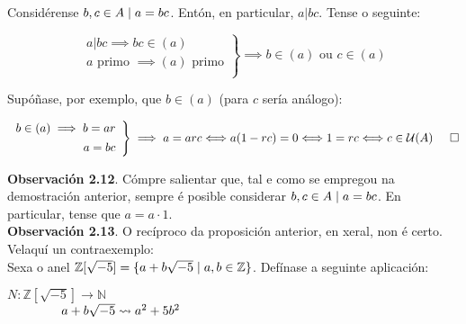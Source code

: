 \documentclass[twoside]{report}
\theoremstyle{mystyle}
\begin{document}
\noindent Considérense $b, c \in A \hspace{1mm} | \hspace{1mm} a = bc$. Entón, en particular, $a | bc$. Tense o seguinte:

\[ 
\left. \begin{array}{r} 
a | bc \implies bc \in (a) \\[1ex]
a \text{ primo } \implies (a) \text{ primo}\\
\end{array} \right\} 
\implies b \in (a) \text{ ou } c \in (a)
\]

\noindent Supóñase, por exemplo, que $b \in (a)$ (para $c$ sería análogo):

\[ 
\left. \begin{array}{r} 
b \in (a) \implies b = ar \\[1ex]
a = bc\\
\end{array} \right\} 
\implies a = arc \Longleftrightarrow a(1 - rc) = 0 \Longleftrightarrow 1 = rc \Longleftrightarrow c \in \mathcal{U}(A) \hspace{5mm} \square
\]

\vspace{3mm}

\noindent \textbf{Observación 2.12}. Cómpre salientar que, tal e como se empregou na demostración anterior, sempre é posible considerar $b,c \in A \hspace{1mm} | \hspace{1mm} a = bc$. En particular, tense que $a = a \cdot 1$.\\

\noindent \textbf{Observación 2.13}. O recíproco da proposición anterior, en xeral, non é certo. Velaquí un contraexemplo:\\

\noindent Sexa o anel $\mathbb{Z}[\sqrt{-5}] = \{a + b\sqrt{
-5} \hspace{1mm} | \hspace{1mm} a,b \in \mathbb{Z}\}$. Defínase a seguinte aplicación:

        \begin{center}
            $N: \mathbb{Z}[\sqrt{-5}] \longrightarrow \displaystyle \mathbb{N}$\\
            \vspace{2mm}
            $\hspace{15mm} a + b\sqrt{-5} \leadsto a^{2} + 5b^{2}$
        \end{center}
        
\end{document}
